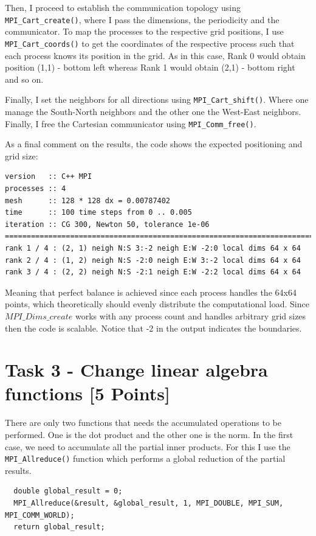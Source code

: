 \documentclass[unicode,11pt,a4paper,oneside,numbers=endperiod,openany]{scrartcl}
\begin{document}
Then, I proceed to establish the communication topology using \texttt{MPI\_Cart\_create()}, where I pass the 
dimensions, the periodicity and the communicator. To map the processes to the respective grid positions, 
I use \texttt{MPI\_Cart\_coords()} to get the coordinates of the respective process such that
each process knows its position in the grid. As in this case, Rank 0 would obtain position (1,1) - bottom left
whereas Rank 1 would obtain (2,1) - bottom right and so on.

Finally, I set the neighbors for all directions using \texttt{MPI\_Cart\_shift()}.
Where one manage the South-North neighbors and the other one the West-East neighbors.
Finally, I free the Cartesian communicator using \texttt{MPI\_Comm\_free()}.

As a final comment on the results, the code shows the expected positioning and grid size:

\begin{verbatim}
version   :: C++ MPI
processes :: 4
mesh      :: 128 * 128 dx = 0.00787402
time      :: 100 time steps from 0 .. 0.005
iteration :: CG 300, Newton 50, tolerance 1e-06
================================================================================
rank 1 / 4 : (2, 1) neigh N:S 3:-2 neigh E:W -2:0 local dims 64 x 64
rank 2 / 4 : (1, 2) neigh N:S -2:0 neigh E:W 3:-2 local dims 64 x 64
rank 3 / 4 : (2, 2) neigh N:S -2:1 neigh E:W -2:2 local dims 64 x 64
\end{verbatim}

Meaning that perfect balance is achieved since each process handles the 64x64 points, which
theoretically should evenly distribute the computational load. Since $MPI\_Dims\_create$ works
with any process count and handles arbitrary grid sizes then the code is scalable. 
Notice that -2 in the output indicates the boundaries. 


\section{Task 3 - Change linear algebra functions [5 Points]}

There are only two functions that needs the accumulated operations to be performed. 
One is the dot product and the other one is the norm. In the first case, we need to 
accumulate all the partial inner products. For this I use the \texttt{MPI\_Allreduce()} function
which performs a global reduction of the partial results. 

\begin{verbatim}
  double global_result = 0;
  MPI_Allreduce(&result, &global_result, 1, MPI_DOUBLE, MPI_SUM, MPI_COMM_WORLD);
  return global_result;
\end{verbatim}
\end{document}
